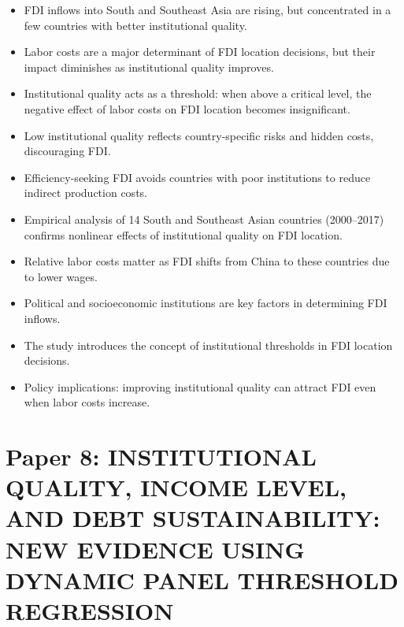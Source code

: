 \documentclass[10pt, oneside]{article}
\begin{document}
\begin{itemize}
	\item FDI inflows into South and Southeast Asia are rising, but concentrated in a few countries with better institutional quality.
	\item Labor costs are a major determinant of FDI location decisions, but their impact diminishes as institutional quality improves.
	\item Institutional quality acts as a threshold: when above a critical level, the negative effect of labor costs on FDI location becomes insignificant.
	\item Low institutional quality reflects country-specific risks and hidden costs, discouraging FDI.
	\item Efficiency-seeking FDI avoids countries with poor institutions to reduce indirect production costs.
	\item Empirical analysis of 14 South and Southeast Asian countries (2000–2017) confirms nonlinear effects of institutional quality on FDI location.
	\item Relative labor costs matter as FDI shifts from China to these countries due to lower wages.
	\item Political and socioeconomic institutions are key factors in determining FDI inflows.
	\item The study introduces the concept of institutional thresholds in FDI location decisions.
	\item Policy implications: improving institutional quality can attract FDI even when labor costs increase.
\end{itemize}


\section{Paper 8: INSTITUTIONAL QUALITY, INCOME LEVEL,
  AND DEBT SUSTAINABILITY: NEW EVIDENCE USING
  DYNAMIC PANEL THRESHOLD REGRESSION}
\end{document}
